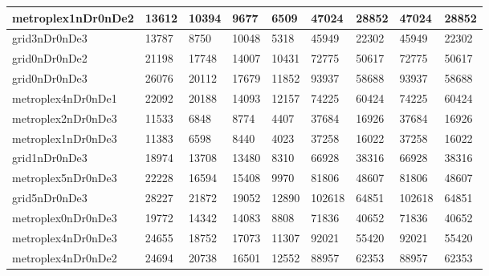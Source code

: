 \documentclass[../thesis.tex]{subfiles}
\begin{document}
\begin{table}[!ht]
\begin{tabular}{|l|l|l|l|l|l|l|l|l|}
        metroplex1nDr0nDe2 & 13612 & 10394 & 9677 & 6509 & 47024 & 28852 & 47024 & 28852 \\ \hline
        grid3nDr0nDe3 & 13787 & 8750 & 10048 & 5318 & 45949 & 22302 & 45949 & 22302 \\ \hline
        grid0nDr0nDe2 & 21198 & 17748 & 14007 & 10431 & 72775 & 50617 & 72775 & 50617 \\ \hline
        grid0nDr0nDe3 & 26076 & 20112 & 17679 & 11852 & 93937 & 58688 & 93937 & 58688 \\ \hline
        metroplex4nDr0nDe1 & 22092 & 20188 & 14093 & 12157 & 74225 & 60424 & 74225 & 60424 \\ \hline
        metroplex2nDr0nDe3 & 11533 & 6848 & 8774 & 4407 & 37684 & 16926 & 37684 & 16926 \\ \hline
        metroplex1nDr0nDe3 & 11383 & 6598 & 8440 & 4023 & 37258 & 16022 & 37258 & 16022 \\ \hline
        grid1nDr0nDe3 & 18974 & 13708 & 13480 & 8310 & 66928 & 38316 & 66928 & 38316 \\ \hline
        metroplex5nDr0nDe3 & 22228 & 16594 & 15408 & 9970 & 81806 & 48607 & 81806 & 48607 \\ \hline
        grid5nDr0nDe3 & 28227 & 21872 & 19052 & 12890 & 102618 & 64851 & 102618 & 64851 \\ \hline
        metroplex0nDr0nDe3 & 19772 & 14342 & 14083 & 8808 & 71836 & 40652 & 71836 & 40652 \\ \hline
        metroplex4nDr0nDe3 & 24655 & 18752 & 17073 & 11307 & 92021 & 55420 & 92021 & 55420 \\ \hline
        metroplex4nDr0nDe2 & 24694 & 20738 & 16501 & 12552 & 88957 & 62353 & 88957 & 62353 \\ \hline
    \end{tabular}
\end{table}
\end{document}
